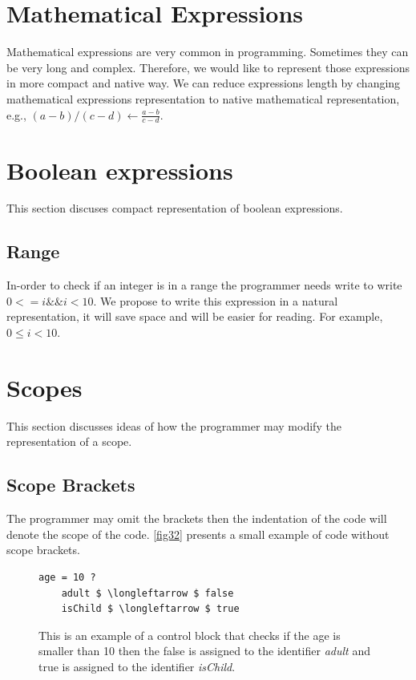 \section{Mathematical Expressions}
Mathematical expressions are very common in programming. Sometimes they can be very long and complex. Therefore, we would like to represent those expressions in more compact and native way. We can reduce expressions length by changing mathematical expressions representation to native mathematical representation, e.g., $ (a-b)/(c-d) \longleftarrow \frac{a-b}{c-d} $.
\section{Boolean expressions}
This section discuses compact representation of boolean expressions.
\subsection{Range} \label{subsection: Range}
In-order to check if an integer is in a range the programmer needs write to write $ 0 <= i \&\& i < 10 $. We propose to write this expression in a natural representation, it will save space and will be easier for reading. For example, $ 0 \leq i < 10 $.
\section{Scopes}
This section discusses ideas of how the programmer may modify the representation of a scope.
\subsection{Scope Brackets}
The programmer may omit the brackets then the indentation of the code will denote the scope of the code. \autoref{fig32} presents a small example of code without scope brackets.
\begin{figure}[H]
\begin{lstlisting}
age = 10 ?
	adult $ \longleftarrow $ false
	isChild $ \longleftarrow $ true
\end{lstlisting}
\caption{This is an example of a control block that checks if the age is smaller than 10 then the false is assigned to the identifier \textit{adult} and true is assigned to the identifier \textit{isChild}.}
\label{fig32}
\end{figure}
